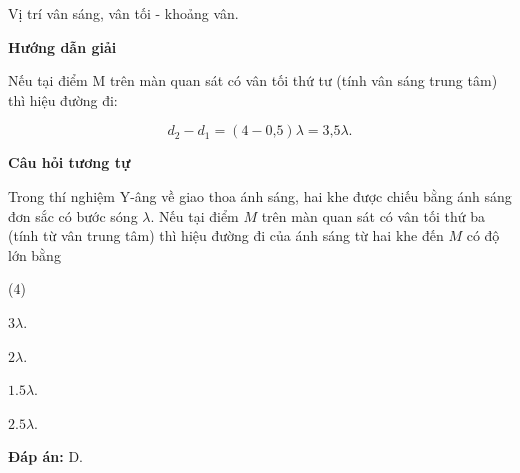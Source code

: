 \begin{dang}{Vị trí vân sáng, vân tối - khoảng vân.}
	
	{	\begin{center}
			\textbf{Hướng dẫn giải}
		\end{center}
		
		Nếu tại điểm M trên màn quan sát có vân tối thứ tư (tính vân sáng trung tâm) thì hiệu đường đi:
		
		\begin{equation*}
			d_2 - d_1 = (4-\text{0,5})\lambda = \text{3,5} \lambda.
		\end{equation*}
		
		
		\begin{center}
			\textbf{Câu hỏi tương tự}
		\end{center}
		
		Trong thí nghiệm Y-âng về giao thoa ánh sáng, hai khe được chiếu bằng ánh sáng đơn sắc có bước sóng $ \lambda $. Nếu tại điểm $ M $ trên màn quan sát có vân tối thứ ba (tính từ vân trung tâm) thì hiệu đường đi của ánh sáng từ hai khe đến $ M $ có độ lớn bằng
		\begin{mcq}(4)
			\item $ 3\lambda $.
			\item $ 2\lambda $.
			\item $ \num{1,5}\lambda $.
			\item $ \num{2,5}\lambda $.
		\end{mcq}
		
		
		\textbf{Đáp án:} D.
	}
	

\end{dang}
